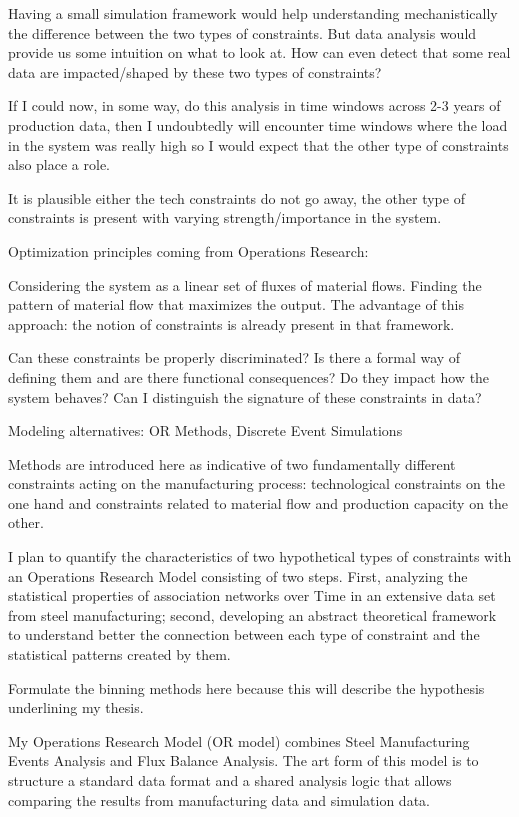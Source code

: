 {\color{red} 
	Having a small simulation framework would help understanding mechanistically the difference between the two types of constraints. But data analysis would provide us some intuition on what to look at. How can even detect that some real data are impacted/shaped by these two types of constraints?
	
	If I could now, in some way, do this analysis in time windows across 2-3 years of production data, then I undoubtedly will encounter time windows where the load in the system was really high so I would expect that the other type of constraints also place a role.
	
	It is plausible either the tech constraints do not go away, the other type of constraints is present with varying strength/importance in the system.
	
	Optimization principles coming from Operations Research:
	
	Considering the system as a linear set of fluxes of material flows. Finding the pattern of material flow that maximizes the output. The advantage of this approach: the notion of constraints is already present in that framework.
	
	Can these constraints be properly discriminated?
	Is there a formal way of defining them and are there functional consequences?
	Do they impact how the system behaves?
	Can I distinguish the signature of these constraints in data?
	
	Modeling alternatives: OR Methods, Discrete Event Simulations
	
	
	
	Methods are introduced here as indicative of two fundamentally different constraints acting on the manufacturing process: technological constraints on the one hand and constraints related to material flow and production capacity on the other.
	
	I plan to quantify the characteristics of two hypothetical types of constraints with an Operations Research Model consisting of two steps. First, analyzing the statistical properties of association networks over Time in an extensive data set from steel manufacturing; second, developing an abstract theoretical framework to understand better the connection between each type of constraint and the statistical patterns created by them. 
	
	Formulate the binning methods here because this will describe the hypothesis underlining my thesis.
	
	My Operations Research Model (OR model) combines Steel Manufacturing Events Analysis and Flux Balance Analysis. The art form of this model is to structure a standard data format and a shared analysis logic that allows comparing the results from manufacturing data and simulation data.
}